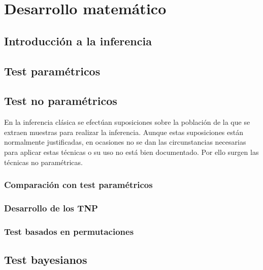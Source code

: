 %
%


\chapter{Desarrollo matemático}

\section{Introducción a la inferencia}
		
	
	
\section{Test paramétricos}

	
	
	

\section{Test no paramétricos}

	En la inferencia clásica se efectúan suposiciones sobre la población de la que se extraen muestras para realizar la inferencia. Aunque estas suposiciones están normalmente justificadas, en ocasiones no se dan las circunstancias necesarias para aplicar estas técnicas o su uso no está bien documentado. Por ello surgen las técnicas no paramétricas.
	
	\subsection{Comparación con test paramétricos}
		

	\subsection{Desarrollo de los TNP}
		
	
	

	\subsection{Test basados en permutaciones}

\section{Test bayesianos}	
%